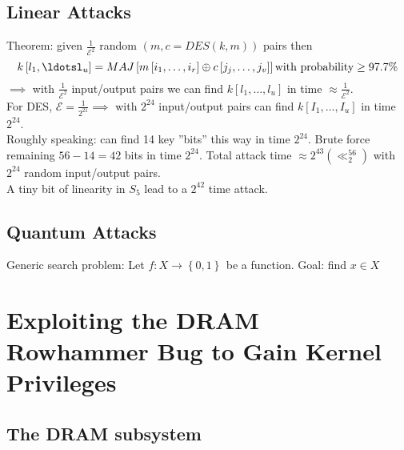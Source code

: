 \documentclass[a4paper]{article}
\begin{document}
	\subsection{Linear Attacks}
	Theorem: given $\frac{1}{\mathcal{E}^2}$ random $\left( m,c=DES\left( k,m \right)  \right) $ pairs then
	\begin{equation*}
		k\left[ l_1,\ldotsl_u \right] = MAJ \left[ m\left[ i_1,\ldots,i_r \right] \oplus c\left[ j_j,\ldots,j_v \right]   \right] \text{with probability} \ge 97.7\%
	\end{equation*}
	$\implies$ with $\frac{1}{\mathcal{E}^2}$ input/output pairs we can find $k\left[ l_1,\ldots,l_u \right] $ in time $\approx \frac{1}{\mathcal{E}^2}$.\\
	For DES, $\mathcal{E} = \frac{1}{2^{21}}\implies$ with $2^{24}$ input/output pairs can find
	$k\left[ I_1,\ldots,I_u \right] $ in time $2^{24}$.\\
	Roughly speaking: can find 14 key ''bits'' this way in time $2^{24}$. Brute force
	remaining $56-14=42$ bits in time $2^{24}$. Total attack time $\approx 2^{43}\left( \ll_2^{56} \right) $ 
	with $2^{24}$ random input/output pairs.\\
	A tiny bit of linearity in $S_5$ lead to a $2^{42}$ time attack.
	
	\subsection{Quantum Attacks}
	Generic search problem: Let $f: X \to \left\{ 0,1 \right\}^{} $ be a function. Goal:
	find $x \in X $
		

	\section{Exploiting the DRAM Rowhammer Bug to Gain Kernel Privileges}
	\subsection{The DRAM subsystem}
	
\end{document}
